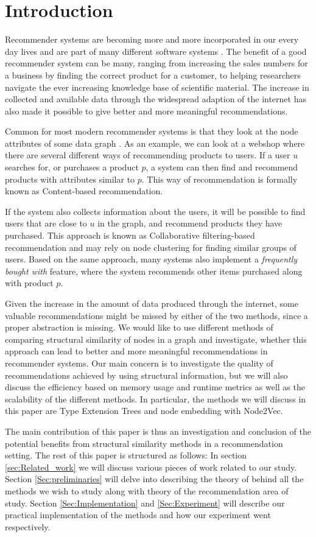 \section{Introduction}
  Recommender systems are becoming more and more incorporated in our every day lives and are part of many different software systems \cite{recommender_e-comerce}. The benefit of a good recommender system can be many,  ranging from increasing the sales numbers for a business by finding the correct product for a customer, to helping researchers navigate the ever increasing knowledge base of scientific material. The increase in collected and available data through the widespread adaption of the internet has also made it possible to give better and more meaningful recommendations.

  Common for most modern recommender systems is that they look at the node attributes of some data graph \cite{Ricci2015}. As an example, we can look at a webshop where there are several different ways of recommending products to users. If a user $u$ searches for, or purchases a product $p$, a system can then find and recommend products with attributes similar to $p$. This way of recommendation is formally known as Content-based recommendation.

  If the system also collects information about the users, it will be possible to find users that are close to $u$ in the graph, and recommend products they have purchased. This approach is known as Collaborative filtering-based recommendation and may rely on node clustering for finding similar groups of users. Based on the same approach, many systems also implement a \textit{frequently bought with} feature, where the system recommends other items purchased along with product $p$.

  Given the increase in the amount of data produced through the internet, some valuable recommendations might be missed by either of the two methods, since a proper abstraction is missing. We would like to use different methods of comparing structural similarity of nodes in a graph and investigate, whether this approach can lead to better and more meaningful recommendations in recommender systems. Our main concern is to investigate the quality of recommendations achieved by using structural information, but we will also discuss the efficiency based on memory usage and runtime metrics as well as the scalability of the different methods. In particular, the methods we will discuss in this paper are Type Extension Trees and node embedding with Node2Vec.

  The main contribution of this paper is thus an investigation and conclusion of the potential benefits from structural similarity methods in a recommendation setting. The rest of this paper is structured as follows:
  In section \ref{sec:Related_work} we will discuss various pieces of work related to our study. Section \ref{Sec:preliminaries} will delve into describing the theory of behind all the methods we wish to study along with theory of the recommendation area of study. Section \ref{Sec:Implementation} and \ref{Sec:Experiment} will describe our practical implementation of the methods and how our experiment went respectively. 
